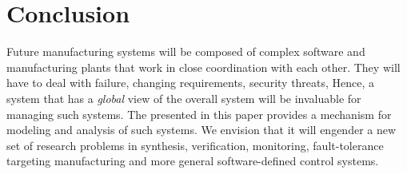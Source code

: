 \section{Conclusion}
\label{sec::concl}

Future manufacturing systems will be composed of complex
software and manufacturing plants that work in close coordination 
with each other. They will have to deal with failure, changing requirements,
security threats, \etc Hence, a system that has a {\em global} view
of the overall system will be invaluable for managing such systems. The
\mfname presented in this paper provides a mechanism for modeling and analysis of such systems. 
We envision that  it will engender a new set of research problems in 
 synthesis, verification, monitoring, fault-tolerance targeting 
 manufacturing and more general software-defined control systems. 
